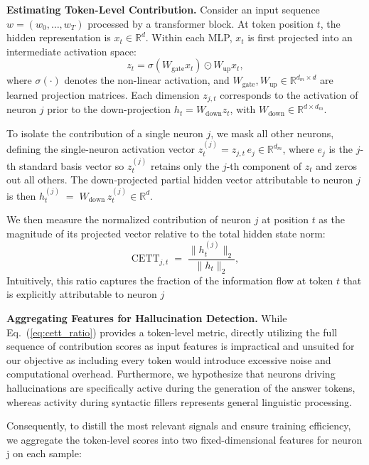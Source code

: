 \documentclass[dvipsnames]{article}
\begin{document}
\textbf{Estimating Token-Level Contribution.}\quad
Consider an input sequence $w = (w_0, \ldots, w_T)$ processed by a transformer block. At token position $t$, the hidden representation is $x_t \in \mathbb{R}^d$. Within each MLP, $x_t$ is first projected into an intermediate activation space:
\begin{equation}
z_t = \sigma(W_{\text{gate}} x_t) \odot W_{\text{up}} x_t,
\end{equation}
where $\sigma(\cdot)$ denotes the non-linear activation, and $W_{\text{gate}}, W_{\text{up}} \in \mathbb{R}^{d_m \times d}$ are learned projection matrices. Each dimension $z_{j,t}$ corresponds to the activation of neuron $j$ prior to the down-projection $h_t = W_{\text{down}} z_t$, with $W_{\text{down}} \in \mathbb{R}^{d \times d_m}$.

\noindent
To isolate the contribution of a single neuron $j$, we mask all other neurons, defining the single-neuron activation vector $z_t^{(j)} = z_{j,t}\, e_j \in \mathbb{R}^{d_m}$,
where $e_j$ is the $j$-th standard basis vector so $z_t^{(j)}$ retains only the $j$-th component of $z_t$ and zeros out all others. The down-projected partial hidden vector attributable to neuron $j$ is then $h_t^{(j)} \;=\; W_{\text{down}}\, z_t^{(j)} \in \mathbb{R}^{d}$.

We then measure the normalized contribution of neuron $j$ at position $t$ as the magnitude of its projected vector relative to the total hidden state norm:
\begin{equation}\label{eq:cett_ratio}
\mathrm{CETT}_{j,t} \;=\; \frac{\|h_t^{(j)}\|_2}{\|h_t\|_2}, %
\end{equation}
Intuitively, this ratio captures the fraction of the information flow at token $t$ that is explicitly attributable to neuron $j$

\textbf{Aggregating Features for Hallucination Detection.}\quad
While Eq.~(\ref{eq:cett_ratio}) provides a token-level metric, directly utilizing the full sequence of contribution scores as input features is impractical and unsuited for our objective as including every token would introduce excessive noise and computational overhead. Furthermore, we hypothesize that neurons driving hallucinations are specifically active during the generation of the answer tokens, whereas activity during syntactic fillers represents general linguistic processing.

Consequently, to distill the most relevant signals and ensure training efficiency, we aggregate the token-level scores into two fixed-dimensional features for neuron j on each sample:
\end{document}
